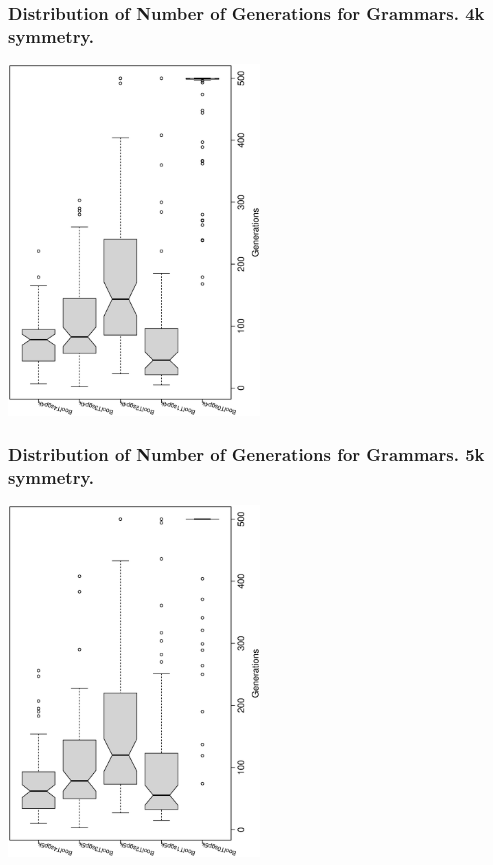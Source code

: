 \documentclass[18pt,c]{beamer}
\begin{document}
 \begin{frame}
 \frametitle{ Distribution of Number of Generations for Grammars. 4k  symmetry. }
 \begin{center}
\includegraphics[width=0.5\textwidth, angle=-90]
{ExpBboxplottGenerations002.eps}
 \end{center}
 \label{ExpBboxplottGenerations002.eps}  
 \end{frame}

 \begin{frame}
 \frametitle{ Distribution of Number of Generations for Grammars. 5k  symmetry. }
 \begin{center}
\includegraphics[width=0.5\textwidth, angle=-90]
{ExpBboxplottGenerations003.eps}
 \end{center}
 \label{ExpBboxplottGenerations003.eps}  
 \end{frame}
\end{document}
